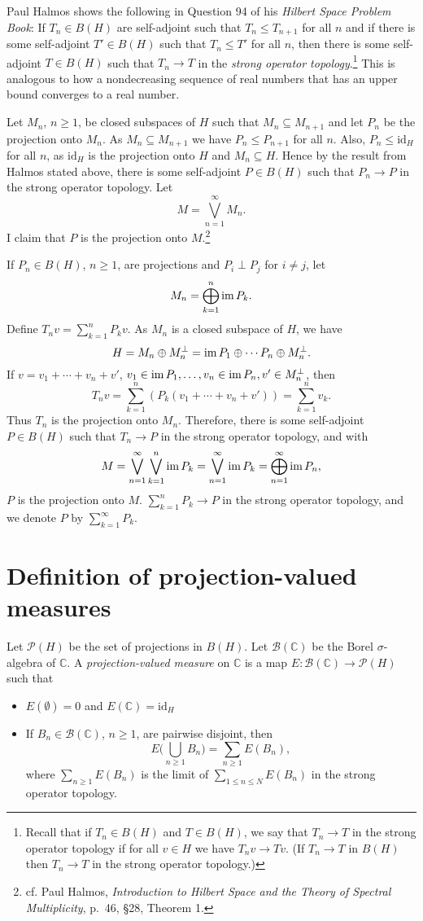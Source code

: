 \documentclass{article}
\newcommand{\im}{\textrm{im\,}}
\newcommand{\id}{\textrm{id}}
\begin{document}
Paul Halmos shows the following in Question 94 of his {\em Hilbert Space Problem Book}: If $T_n \in B(H)$ are self-adjoint such that
$T_n \leq T_{n+1}$ for all $n$ and if there is some self-adjoint
$T' \in B(H)$ such that
$T_n \leq T'$ for all $n$, then 
there is some self-adjoint $T \in B(H)$ such that $T_n \to T$ in the {\em strong operator topology}.\footnote{Recall that if $T_n \in B(H)$ and $T \in B(H)$, we say that $T_n \to T$ in the strong
operator topology if for all $v \in H$ we have $T_n v \to Tv$. (If $T_n \to T$ in $B(H)$ then $T_n \to T$ in the strong operator topology.)} This is analogous to how a nondecreasing
sequence of real numbers that has an upper bound converges to a real number.

Let $M_n$, $n \geq 1$, be closed subspaces of $H$ such that $M_n \subseteq M_{n+1}$ and let $P_n$ be the projection onto $M_n$. As $M_n \subseteq M_{n+1}$ we have $P_n \leq P_{n+1}$ for all $n$. Also,
$P_n \leq \id_H$ for all $n$, as $\id_H$ is the projection onto $H$ and $M_n \subseteq H$. Hence by the result from Halmos stated above, there is some self-adjoint $P \in B(H)$ such that
$P_n \to P$ in the strong operator topology. Let
\[
M=\bigvee_{n=1}^\infty M_n.
\]
I claim that $P$ is the projection onto $M$.\footnote{cf. Paul Halmos, {\em Introduction to Hilbert Space and the Theory of Spectral Multiplicity},
p.~46, \S 28, Theorem 1.}

If $P_n \in B(H)$, $n \geq 1$, are projections and $P_i \perp P_j$ for $i \neq j$, 
let 
\[
M_n = \bigoplus_{k=1}^n \im P_k.
\]
Define $T_n v=\sum_{k=1}^n P_k v$. As $M_n$ is a closed subspace of $H$, we have
\[
H=M_n \oplus M_n^\perp=\im P_1 \oplus \cdots P_n \oplus M_n^\perp.
\]
If $v =v_1+\cdots+v_n+v'$, $v_1 \in \im P_1,\ldots, v_n \in \im P_n, v' \in M_n^\perp$, then
\[
T_n v=\sum_{k=1}^n  \left(P_k (v_1+\cdots+v_n+v')\right)=\sum_{k=1}^n v_k.
\]
Thus $T_n$ is the projection onto $M_n$. Therefore, there is some self-adjoint $P \in B(H)$ such that
$T_n \to P$ in the strong operator topology, and with
\[
M=\bigvee_{n=1}^\infty \bigvee_{k=1}^n \im P_k = \bigvee_{n=1}^\infty \im P_k = \bigoplus_{n=1}^\infty \im P_n,
\]
$P$ is the projection onto $M$.
 $\sum_{k=1}^n P_k \to P$ in the strong operator topology, and we denote $P$
by $\sum_{k=1}^\infty P_k$.


\section{Definition  of projection-valued measures}
Let $\mathscr{P}(H)$ be the set of projections in $B(H)$. Let $\mathscr{B}(\mathbb{C})$ be the Borel $\sigma$-algebra of $\mathbb{C}$. A {\em projection-valued measure} on
$\mathbb{C}$ is a map $E:\mathscr{B}(\mathbb{C}) \to \mathscr{P}(H)$ 
such that
\begin{itemize}
\item $E(\emptyset)=0$ and $E(\mathbb{C})=\id_H$
\item If $B_n \in \mathscr{B}(\mathbb{C})$, $n \geq 1$, are pairwise disjoint, then
\[
E\Big(\bigcup_{n \geq 1} B_n\Big)=\sum_{n \geq 1} E(B_n),
\]
where $\sum_{n \geq 1} E(B_n)$ is the limit of $\sum_{1 \leq n \leq N} E(B_n)$ in the strong operator topology.
\end{itemize}
\end{document}

